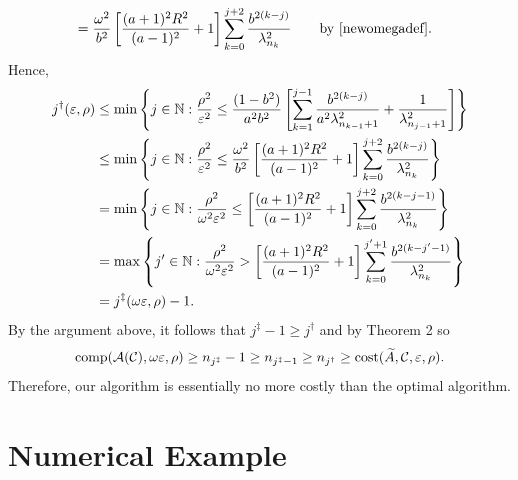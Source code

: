 \documentclass[graybox,footinfo]{svmult}
\begin{document}
{\begin{align*}
&=  \frac{\omega^2}{b^2}\left[\frac{(a+1)^{2} R^2 }{(a-1)^2} + 1\right] \sum_{k=0}^{j+2} \frac{b^{2(k-j)}}{\lambda_{n_{k}}^2} \qquad \text{by \eqref{newomegadef}.}
\end{align*}
Hence,
\begin{align*} 
j^\dagger(\varepsilon,\rho) &\le \min \left \{j \in {\mathbb{N}} : \frac{\rho^2}{\varepsilon^2} \le \frac{(1 - b^2)}{a^2b^2} \left[ \sum_{k=1}^{j-1} \frac{b^{2(k-j)}}{a^2\lambda_{n_{k-1}+1}^2} + \frac{1}{\lambda_{n_{j-1}+1}^2}\right]   \right\} \\
&\le \min \left \{j \in {\mathbb{N}} : \frac{\rho^2}{ \varepsilon^2} \le \frac{\omega^2}{b^2}\left[\frac{(a+1)^{2} R^2 }{(a-1)^2} + 1\right] \sum_{k=0}^{j+2} \frac{b^{2(k-j)}}{\lambda_{n_{k}}^2} \right\} \\
&= \min \left \{j \in {\mathbb{N}} : \frac{\rho^2}{\omega^2 \varepsilon^2} \le \left[\frac{(a+1)^{2} R^2 }{(a-1)^2} + 1\right] \sum_{k=0}^{j+2} \frac{b^{2(k-j-1)}}{\lambda_{n_{k}}^2} \right\} \\
&= \max \left \{j' \in {\mathbb{N}} : \frac{\rho^2}{\omega^2 \varepsilon^2} > \left[\frac{(a+1)^{2} R^2 }{(a-1)^2} + 1\right] \sum_{k=0}^{j'+1} \frac{b^{2(k-j'-1)}}{\lambda_{n_{k}}^2} \right\} \\
& = j^{\ddagger}(\omega\varepsilon,\rho) - 1.
\end{align*}
By the argument above, it follows that $j^\ddagger -1 \ge j^\dagger$ and by Theorem 2 so
\[
\textup{comp}({\mathcal{A}}({\mathcal{C}}),\omega\varepsilon,\rho) \ge n_{j^{\ddagger}} -1 \ge n_{j^{\ddagger}-1} \ge  n_{j^\dagger}\ge \textup{cost}(\widetilde{A},{\mathcal{C}},\varepsilon,\rho) .\]
Therefore, our algorithm is essentially no more costly than the optimal algorithm. }

\section{Numerical Example} \label{sec:examp}
\end{document}
